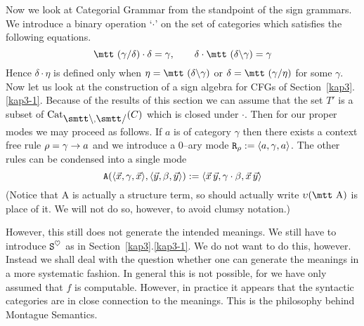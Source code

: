 Now we look at Categorial Grammar from the standpoint of
the sign grammars. We introduce a binary operation `$\cdot$'
on the set of categories which satisfies the following equations.
\begin{equation}
\mbox{\mtt ($\gamma${\tf}$\delta$)} \cdot \delta = \gamma, \qquad
\delta \cdot \mbox{\mtt ($\delta${\tb}$\gamma$)} = \gamma
\end{equation}
Hence $\delta \cdot \eta$ is defined only when
$\eta = \mbox{\mtt ($\delta${\tb}$\gamma$)}$ or 
$\delta = \mbox{\mtt ($\gamma${\tf}$\eta$)}$
for some $\gamma$. Now let us look at the construction of a
sign algebra for CFGs of Section~\ref{kap3}.\ref{kap3-1}.
Because of the results of this section we can assume that
the set $T'$ is a subset of $\Cat_{\mbox{\smtt\tb}, %
\mbox{\smtt\tf}}(C)$ which is closed under $\cdot$. Then for 
our proper  modes we may proceed as follows. If $a$ is of 
category $\gamma$ then there exists a context free rule 
$\rho = \gamma \rightarrow a$ and we introduce a 0--ary mode 
$\mbox{\tt R}_{\rho} := \langle a, \gamma, a\rangle$. The other rules 
can be condensed into a single mode
\begin{equation}
\mbox{\tt A}(\langle \vec{x}, \gamma, \vec{x}\rangle,
    \langle \vec{y}, \beta, \vec{y}\rangle) :=
    \langle \vec{x}\, \vec{y}, \gamma \cdot \beta,
    \vec{x}\, \vec{y}\rangle
\end{equation}
(Notice that {\mtt A} is actually a structure term, so should 
actually write $\upsilon(\mbox{\mtt A})$ is place of it. We will 
not do so, however, to avoid clumsy notation.)

However, this still does not generate the intended meanings.
We still have to introduce $\mbox{\tt S}^{\heartsuit}$
as in Section~\ref{kap3}.\ref{kap3-1}. We do not want to do this,
however. Instead we shall deal with the question whether
one can generate the meanings in a more systematic fashion.
In general this is not possible, for we have only assumed
that $f$ is computable. However, in practice it appears
that the syntactic categories are in close connection to the
meanings. This is the philosophy behind Montague Semantics.

